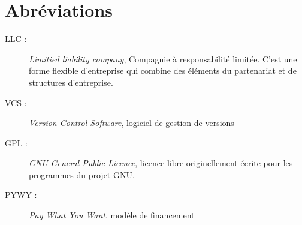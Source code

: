 \chapter*{Abréviations}

\begin{description}
    \item[LLC : ] \emph{Limitied liability company}, Compagnie à
        responsabilité limitée. C'est une forme flexible d'entreprise qui
        combine des éléments du partenariat et de structures d'entreprise.
    \item[VCS : ] \emph{Version Control Software}, logiciel de gestion de versions
    \item[GPL : ] \emph{GNU General Public Licence}, licence libre originellement
        écrite pour les programmes du projet GNU.
    \item[PYWY :] \emph{Pay What You Want}, modèle de financement
\end{description}
